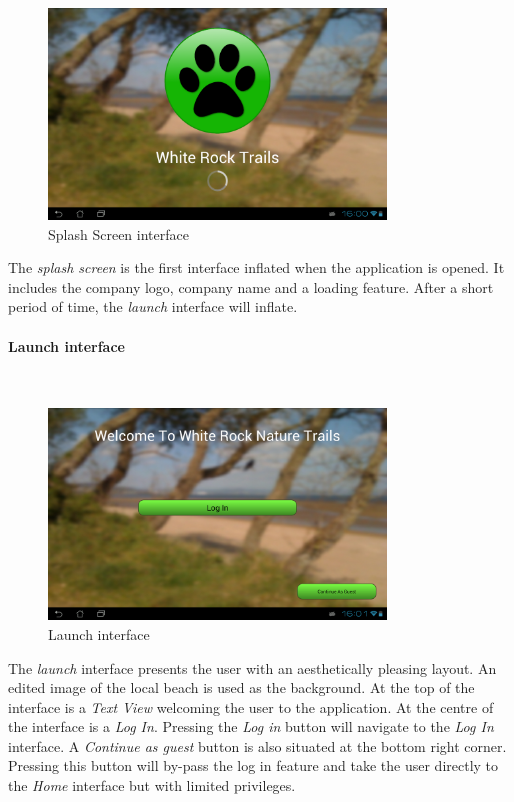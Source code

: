 \documentclass[11pt,a4paper]{report}
\begin{document}
\begin{figure}[H]
    \centering
    \includegraphics[width=0.8\textwidth]{chris/splash_screen}
    \caption{Splash Screen interface}
    \label{fig:splash_screen}
\end{figure}

The \emph{splash screen} is the first interface inflated when the application is opened. It includes the company logo, company name and a loading feature. After a short period of time, the \emph{launch} interface will inflate.

\paragraph*{Launch interface}\mbox{}\\
\begin{figure}[H]
    \centering
    \includegraphics[width=0.8\textwidth]{chris/launch_view}
    \caption{Launch interface}
    \label{fig:launch_view}
\end{figure}

The \emph{launch} interface presents the user with an aesthetically pleasing layout. An edited image of the local beach is used as the background. At the top of the interface is a \emph{Text View} welcoming the user to the application. At the centre of the interface is a \emph{Log In}. Pressing the \emph{Log in} button will navigate to the \emph{Log In} interface. A \emph{Continue as guest} button is also situated at the bottom right corner. Pressing this button will by-pass the log in feature and take the user directly to the \emph{Home} interface but with limited privileges.
\end{document}
